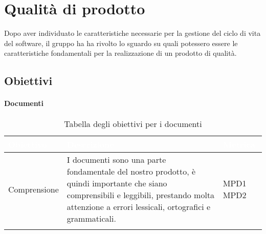 \chapter{Qualità di prodotto}
Dopo aver individuato le caratteristiche necessarie per la gestione del ciclo di vita del software, il gruppo ha ha rivolto lo sguardo su quali potessero essere le caratteristiche fondamentali per la realizzazione di un prodotto di qualità.
\section{Obiettivi}
\subsubsection{Documenti}

\begin{center}
  \renewcommand{\arraystretch}{1.25}
  \begin{longtable}{|p{3cm}|p{7.5cm}|p{2cm}|} \hline
  \rowcolor[HTML]{036400}
  \textcolor{white}{\textbf{Obiettivo}} & \textcolor{white}{\textbf{Descrizione}} & \textcolor{white}{\textbf{Metrica}} \\[0.2em] \hline
  \rowcolor[HTML]{EFEFEF}
    Comprensione & I documenti sono una parte fondamentale del nostro prodotto, è quindi importante che siano comprensibili e leggibili, prestando molta attenzione a errori lessicali, ortografici e grammaticali.  & MPD1 \newline MPD2       \\ \hline
    \caption{Tabella degli obiettivi per i documenti}
  \end{longtable}
\end{center}


